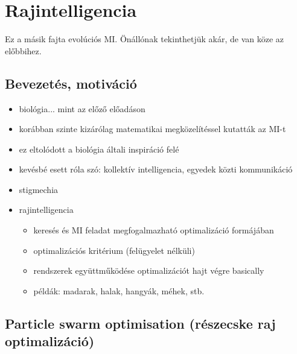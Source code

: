 \documentclass[a4paper, 11pt]{article}
\begin{document}
\newpage

\section{Rajintelligencia}

Ez a másik fajta evolúciós MI. Önállónak tekinthetjük akár, de van köze az előbbihez.

\subsection{Bevezetés, motiváció}

\begin{itemize}
	\item biológia... mint az előző előadáson
	\item korábban szinte kizárólag matematikai megközelítéssel kutatták az MI-t
	\item ez eltolódott a biológia általi inspiráció felé
	\item kevésbé esett róla szó: kollektív intelligencia, egyedek közti kommunikáció
	\item stigmechia
	\item rajintelligencia
	\begin{itemize}
		\item keresés és MI feladat megfogalmazható optimalizáció formájában
		\item optimalizációs kritérium (felügyelet nélküli)
		\item rendszerek együttműködése optimalizációt hajt végre basically
		\item példák: madarak, halak, hangyák, méhek, stb.
	\end{itemize}
\end{itemize}

\subsection{Particle swarm optimisation (részecske raj optimalizáció)}
\end{document}
